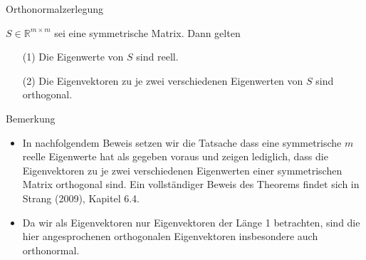 \documentclass[
  8pt,
  ignorenonframetext,
]{beamer}
\providecommand{\tightlist}{%
  \setlength{\itemsep}{0pt}\setlength{\parskip}{0pt}}
\begin{document}
\begin{frame}{Orthonormalzerlegung}
\protect\hypertarget{orthonormalzerlegung}{}
\small
\begin{theorem}
\justifying
\normalfont
$S \in \mathbb{R}^{m \times m}$ sei eine symmetrische Matrix. Dann gelten
\begin{itemize}
\item[(1)] Die Eigenwerte von $S$ sind reell.
\item[(2)] Die Eigenvektoren zu je zwei verschiedenen Eigenwerten von $S$ sind orthogonal. 
\end{itemize}
\end{theorem}
\footnotesize

Bemerkung

\begin{itemize}
\tightlist
\item
  \justifying In nachfolgendem Beweis setzen wir die Tatsache dass eine
  symmetrische \(m\) reelle Eigenwerte hat als gegeben voraus und zeigen
  lediglich, dass die Eigenvektoren zu je zwei verschiedenen Eigenwerten
  einer symmetrischen Matrix orthogonal sind. Ein vollständiger Beweis
  des Theorems findet sich in Strang (2009), Kapitel 6.4.
\item
  Da wir als Eigenvektoren nur Eigenvektoren der Länge 1 betrachten,
  sind die hier angesprochenen orthogonalen Eigenvektoren insbesondere
  auch orthonormal.
\end{itemize}
\end{frame}
\end{document}
